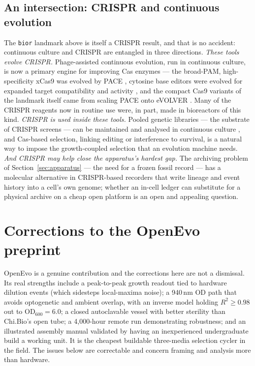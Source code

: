 \documentclass[11pt,a4paper]{article}
\begin{document}
\subsection{An intersection: {CRISPR} and continuous evolution}
\label{sec:crispr}

The \texttt{bior} landmark above is itself a CRISPR result, and that is no accident: continuous
culture and CRISPR are entangled in three directions. \emph{These tools evolve CRISPR.}
Phage-assisted continuous evolution, run in continuous culture, is now a primary engine for
improving Cas enzymes --- the broad-PAM, high-specificity xCas9 was evolved by PACE
\cite{hu2018xcas9}, cytosine base editors were evolved for expanded target compatibility and
activity \cite{thuronyi2019bepace}, and the compact Cas9 variants of the landmark itself came from
scaling PACE onto eVOLVER \cite{huang2022epace}. Many of the CRISPR reagents now in routine use
were, in part, made in bioreactors of this kind. \emph{CRISPR is used inside these tools.} Pooled
genetic libraries --- the substrate of CRISPR screens --- can be maintained and analysed in
continuous culture \cite{mcgeachy2019}, and Cas-based selection, linking editing or interference to
survival, is a natural way to impose the growth-coupled selection that an evolution machine needs.
\emph{And CRISPR may help close the apparatus's hardest gap.} The archiving problem of
Section~\ref{sec:apparatus} --- the need for a frozen fossil record --- has a molecular alternative
in CRISPR-based recorders that write lineage and event history into a cell's own genome; whether an
in-cell ledger can substitute for a physical archive on a cheap open platform is an open and
appealing question.

\section{Corrections to the OpenEvo preprint}
\label{sec:corrections}

OpenEvo is a genuine contribution and the corrections here are not a dismissal. Its real
strengths include a peak-to-peak growth readout tied to hardware dilution events (which
sidesteps local-maxima noise); a 940\,nm OD path that avoids optogenetic and ambient overlap,
with an inverse model holding $R^2 \ge 0.98$ out to $\mathrm{OD}_{600}=6.0$; a closed
autoclavable vessel with better sterility than Chi.Bio's open tube; a 4{,}000-hour remote run
demonstrating robustness; and an illustrated assembly manual validated by having an
inexperienced undergraduate build a working unit. It is the cheapest buildable three-media
selection cycler in the field. The issues below are correctable and concern framing and
analysis more than hardware.
\end{document}
